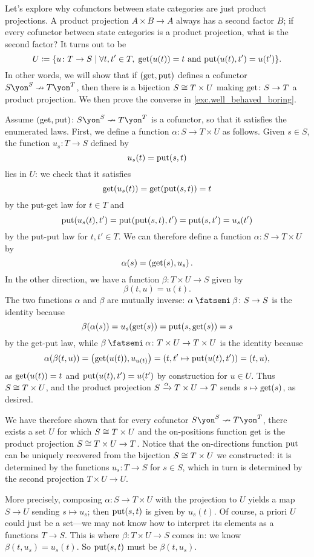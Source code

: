 \documentclass[Book-Poly]{subfiles}
\begin{document}
\begin{example}
Let's explore why cofunctors between state categories are just product projections.
A product projection $A\times B\to A$ always has a second factor $B$; if every cofunctor between state categories is a product projection, what is the second factor?
It turns out to be
\[
    U\coloneqq\{u\colon T\to S\mid \forall t,t'\in T,\;\mathrm{get}(u(t))=t\text{ and }\mathrm{put}(u(t),t')=u(t')\}.
\]
In other words, we will show that if $(\mathrm{get},\mathrm{put})$ defines a cofunctor $S\yon^S\cof T\yon^T$, then there is a bijection $S\cong T\times U$ making $\mathrm{get}\colon S\to T$ a product projection.
We then prove the converse in \cref{exc.well_behaved_boring}.

Assume $(\lensget,\lensput)\colon S\yon^S\cof T\yon^T$ is a cofunctor, so that it satisfies the enumerated laws.
First, we define a function $\alpha\colon S\to T\times U$ as follows.
Given $s\in S$, the function $u_s\colon T\to S$ defined by
\[
    u_s(t)=\mathrm{put}(s,t)
\]
lies in $U$: we check that it satisfies
\[
    \mathrm{get}(u_s(t))=\mathrm{get}(\mathrm{put}(s,t))=t
\]
by the put-get law for $t\in T$ and
\[
    \mathrm{put}(u_s(t),t')=\mathrm{put}(\mathrm{put}(s,t),t')=\mathrm{put}(s,t')=u_s(t')
\]
by the put-put law for $t,t'\in T$.
We can therefore define a function $\alpha\colon S\to T\times U$ by
\[
    \alpha(s)=\left(\mathrm{get}(s),u_s\right).
\]
In the other direction, we have a function $\beta\colon T\times U\to S$ given by
\[
    \beta(t,u)=u(t).
\]
The two functions $\alpha$ and $\beta$ are mutually inverse: $\alpha\then\beta\colon S\to S$ is the identity because
\[
    \beta(\alpha(s))=u_s(\mathrm{get}(s))=\mathrm{put}(s,\mathrm{get}(s))=s
\]
by the get-put law, while $\beta\then\alpha\colon T\times U\to T\times U$ is the identity because
\[
    \alpha(\beta(t,u))=\left(\mathrm{get}(u(t)),u_{u(t)}\right)=(t,t'\mapsto\mathrm{put}(u(t),t'))=(t,u),
\]
as $\mathrm{get}(u(t))=t$ and $\mathrm{put}(u(t),t')=u(t')$ by construction for $u\in U$.
Thus $S\cong T\times U$, and the product projection $S\xrightarrow{\alpha} T\times U\to T$ sends $s\mapsto\mathrm{get}(s)$, as desired.

We have therefore shown that for every cofunctor $S\yon^S\cof T\yon^T$, there exists a set $U$ for which $S\cong T\times U$ and the on-positions function $\mathrm{get}$ is the product projection $S\cong T\times U\to T$.
Notice that the on-directions function $\mathrm{put}$ can be uniquely recovered from the bijection $S\cong T\times U$ we constructed: it is determined by the functions $u_s\colon T\to S$ for $s\in S$, which in turn is determined by the second projection $T\times U\to U$.

More precisely, composing $\alpha\colon S\to T\times U$ with the projection to $U$ yields a map $S\to U$ sending $s\mapsto u_s$; then $\mathrm{put}(s,t)$ is given by $u_s(t)$.
Of course, a priori $U$ could just be a set---we may not know how to interpret its elements as a functions $T\to S$.
This is where $\beta\colon T\times U\to S$ comes in: we know $\beta(t,u_s)=u_s(t)$.
So $\mathrm{put}(s,t)$ must be $\beta(t,u_s)$.
\end{example}
\end{document}
